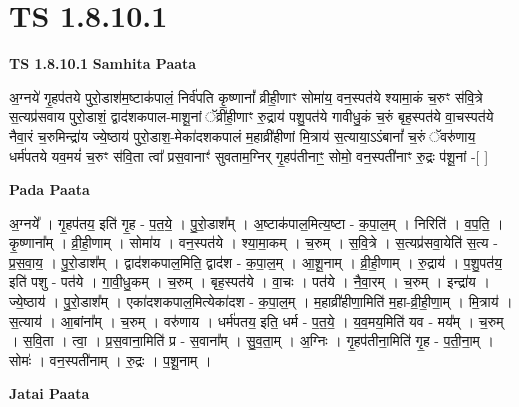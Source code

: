 \documentclass[17pt]{extarticle}
\begin{document}
\section*{ TS 1.8.10.1 }

\textbf{TS 1.8.10.1 } \newline
\textbf{Samhita Paata} \newline

अ॒ग्नये॑ गृ॒हप॑तये पुरो॒डाश॑म॒ष्टाक॑पालं॒ निर्व॑पति कृ॒ष्णानां᳚ व्रीही॒णाꣳ सोमा॑य॒ वन॒स्पत॑ये श्यामा॒कं च॒रुꣳ स॑वि॒त्रे स॒त्यप्र॑सवाय पुरो॒डाशं॒ द्वाद॑शकपाल-माशू॒नां ॅव्री॑ही॒णाꣳ रु॒द्राय॑ पशु॒पत॑ये गावीधु॒कं च॒रुं बृह॒स्पत॑ये वा॒चस्पत॑ये नैवा॒रं च॒रुमिन्द्रा॑य ज्ये॒ष्ठाय॑ पुरो॒डाश॒-मेका॑दशकपालं म॒हाव्री॑हीणां मि॒त्राय॑ स॒त्याया॒ऽऽंबानां᳚ च॒रुं ॅवरु॑णाय॒ धर्म॑पतये यव॒मयं॑ च॒रुꣳ स॑वि॒ता त्वा᳚ प्रस॒वानाꣳ॑ सुवताम॒ग्निर् गृ॒हप॑तीनाꣳ॒॒ सोमो॒ वन॒स्पती॑नाꣳ रु॒द्रः प॑शू॒नां -[ ] \newline

\textbf{Pada Paata} \newline

अ॒ग्नये᳚ । गृ॒हप॑तय॒ इति॑ गृ॒ह - प॒त॒ये॒ । पु॒रो॒डाश᳚म् । अ॒ष्टाक॑पाल॒मित्य॒ष्टा - क॒पा॒ल॒म् । निरिति॑ । व॒प॒ति॒ । कृ॒ष्णाना᳚म् । व्री॒ही॒णाम् । सोमा॑य । वन॒स्पत॑ये । श्या॒मा॒कम् । च॒रुम् । स॒वि॒त्रे । स॒त्यप्र॑सवा॒येति॑ स॒त्य - प्र॒स॒वा॒य॒ । पु॒रो॒डाश᳚म् । द्वाद॑शकपाल॒मिति॒ द्वाद॑श - क॒पा॒ल॒म् । आ॒शू॒नाम् । व्री॒ही॒णाम् । रु॒द्राय॑ । प॒शु॒पत॑य॒ इति॑ पशु - पत॑ये । गा॒वी॒धु॒कम् । च॒रुम् । बृह॒स्पत॑ये । वा॒चः । पत॑ये । नै॒वा॒रम् । च॒रुम् । इन्द्रा॑य । ज्ये॒ष्ठाय॑ । पु॒रो॒डाश᳚म् । एका॑दशकपाल॒मित्येका॑दश - क॒पा॒ल॒म् । म॒हाव्री॑हीणा॒मिति॑ म॒हा-व्री॒ही॒णा॒म् । मि॒त्राय॑ । स॒त्याय॑ । आ॒बांना᳚म् । च॒रुम् । वरु॑णाय । धर्म॑पतय॒ इति॒ धर्म - प॒त॒ये॒ । य॒व॒मय॒मिति॑ यव - मय᳚म् । च॒रुम् । स॒वि॒ता । त्वा॒ । प्र॒स॒वाना॒मिति॑ प्र - स॒वाना᳚म् । सु॒व॒ता॒म् । अ॒ग्निः । गृ॒हप॑तीना॒मिति॑ गृ॒ह - प॒ती॒ना॒म् । सोमः॑ । वन॒स्पती॑नाम् । रु॒द्रः । प॒शू॒नाम् ।  \newline



\textbf{Jatai Paata} \newline
\end{document}
